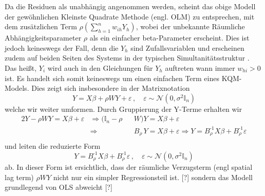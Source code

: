 Da die Residuen als unabhängig angenommen werden, scheint das obige Modell der 
gewöhnlichen Kleinste Quadrate Methode (engl. OLM) zu entsprechen, mit dem zusätzlichen 
Term $\rho (\sum_{h=1}^{n} w_{ih} Y_{h})$, wobei der unbekannte Räumliche Abhängigkeitsparameter $\rho$ 
als ein einfacher beta-Parameter erscheint. Dies ist jedoch keineswegs der Fall, denn die $Y_{h}$ sind
Zufallsvariablen und erscheinen zudem auf beiden Seiten des Systems in der typischen \glqq Simultanitätsstruktur \grqq.
Das heißt, $Y_{i}$ wird auch in den Gleichungen für $Y_{h}$ auftreten wann immer $w_{hi}>0$ ist. Es handelt 
sich somit keineswegs um einen einfachen Term eines KQM-Models. Dies zeigt sich insbesondere in der 
Matrixnotation
\begin{equation*}
    Y=X \beta +\rho W Y + \varepsilon \, , \quad 
    \varepsilon \sim \mathcal{N}(0,\sigma^{2} \mathds{I}_{n})
\end{equation*}
welche wir weiter umformen.
Durch Gruppierung der Y-Terme erhalten wir
\begin{alignat*}{2}
    Y - \rho W Y = X \beta + \varepsilon & \Rightarrow (\mathds{I}_{n}-\rho && W)Y =X \beta+\varepsilon \\
                                    & \Rightarrow && B_{\rho} \, Y = X \beta + \varepsilon  \Rightarrow Y= B_{\rho}^{\text{-1}} X \beta + B_{\rho}^{\text{-1}} \varepsilon \\
\end{alignat*}
und leiten die reduzierte Form
\begin{equation} \label{eq-6.10:slm-mod-red}
    Y=B_{\rho}^{\text{-1}} X \beta + B_{\rho}^{\text{-1}} \varepsilon \, , \quad 
    \varepsilon \sim \mathcal{N}(0,\sigma^{2} \mathds{I}_{n})
\end{equation}
ab. In dieser Form ist ersichtlich, dass der räumliche Verzugsterm (engl spatial lag term) $\rho W Y$ 
nicht nur ein simpler Regressionsteil ist. [?] sondern das Modell grundlegend von OLS abweicht [?]

